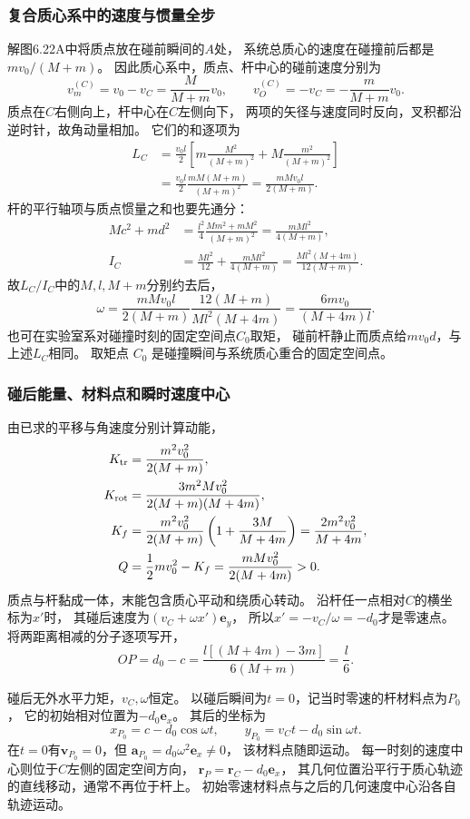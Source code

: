 \documentclass[UTF8,fontset=fandol,a4paper,11pt]{ctexart}
\begin{document}
\subsubsection*{复合质心系中的速度与惯量全步}
解图6.22A中将质点放在碰前瞬间的$A$处，
系统总质心的速度在碰撞前后都是$mv_0/(M+m)$。
因此质心系中，质点、杆中心的碰前速度分别为
\[
v_m^{(C)}=v_0-v_C=\frac{M}{M+m}v_0,\qquad
v_O^{(C)}=-v_C=-\frac{m}{M+m}v_0.
\]
质点在$C$右侧向上，杆中心在$C$左侧向下，
两项的矢径与速度同时反向，叉积都沿逆时针，故角动量相加。
它们的和逐项为
\[
\begin{aligned}
L_C&=\frac{v_0l}{2}
 \left[m\frac{M^2}{(M+m)^2}+M\frac{m^2}{(M+m)^2}\right]\\
&=\frac{v_0l}{2}\frac{mM(M+m)}{(M+m)^2}
 =\frac{mMv_0l}{2(M+m)}.
\end{aligned}
\]
杆的平行轴项与质点惯量之和也要先通分：
\[
\begin{aligned}
Mc^2+md^2
&=\frac{l^2}{4}\frac{Mm^2+mM^2}{(M+m)^2}
 =\frac{mMl^2}{4(M+m)},\\
I_C&=\frac{Ml^2}{12}+\frac{mMl^2}{4(M+m)}
 =\frac{Ml^2(M+4m)}{12(M+m)}.
\end{aligned}
\]
故$L_C/I_C$中的$M,l,M+m$分别约去后，
\[
\omega=\frac{mMv_0l}{2(M+m)}
\frac{12(M+m)}{Ml^2(M+4m)}
=\frac{6mv_0}{(M+4m)l}.
\]
也可在实验室系对碰撞时刻的固定空间点$C_0$取矩，
碰前杆静止而质点给$mv_0d$，与上述$L_C$相同。
取矩点 $C_0$ 是碰撞瞬间与系统质心重合的固定空间点。

\subsubsection*{碰后能量、材料点和瞬时速度中心}
由已求的平移与角速度分别计算动能，
\[
\begin{aligned}
K_{\rm tr}&=\frac{m^2v_0^2}{2(M+m)},\\
K_{\rm rot}&=\frac{3m^2Mv_0^2}{2(M+m)(M+4m)},\\
K_f&=\frac{m^2v_0^2}{2(M+m)}
 \left(1+\frac{3M}{M+4m}\right)
 =\frac{2m^2v_0^2}{M+4m},\\
Q&=\frac12mv_0^2-K_f
 =\frac{mMv_0^2}{2(M+4m)}>0.
\end{aligned}
\]
质点与杆黏成一体，末能包含质心平动和绕质心转动。
沿杆任一点相对$C$的横坐标为$x'$时，
其碰后速度为$(v_C+\omega x')\boldsymbol e_y$，
所以$x'=-v_C/\omega=-d_0$才是零速点。
将两距离相减的分子逐项写开，
\[
OP=d_0-c=\frac{l[(M+4m)-3m]}{6(M+m)}=\frac l6.
\]

碰后无外水平力矩，$v_C,\omega$恒定。
以碰后瞬间为$t=0$，记当时零速的杆材料点为$P_0$，
它的初始相对位置为$-d_0\boldsymbol e_x$。
其后的坐标为
\[
x_{P_0}=c-d_0\cos\omega t,\qquad
y_{P_0}=v_Ct-d_0\sin\omega t.
\]
在$t=0$有$\boldsymbol v_{P_0}=0$，但
$\boldsymbol a_{P_0}=d_0\omega^2\boldsymbol e_x\ne0$，
该材料点随即运动。
每一时刻的速度中心则位于$C$左侧的固定空间方向，
$\boldsymbol r_{P}=\boldsymbol r_C-d_0\boldsymbol e_x$，
其几何位置沿平行于质心轨迹的直线移动，通常不再位于杆上。
初始零速材料点与之后的几何速度中心沿各自轨迹运动。
\end{document}
